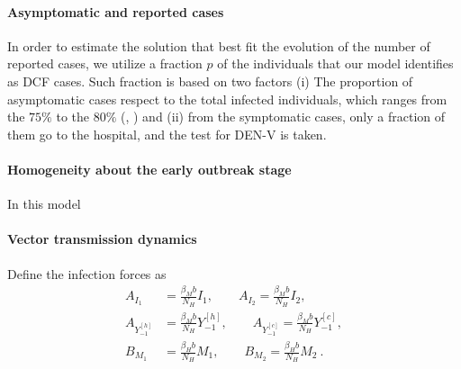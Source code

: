     \paragraph{Asymptomatic and reported cases} In order to estimate the solution that best fit the 
    evolution of the number of reported cases, we utilize a fraction $p$ of the individuals that our model identifies as DCF cases. Such fraction is based on two factors (i) The proportion of asymptomatic cases respect to the total infected individuals, which ranges from the $75\%$ to the $80\%$ (\cite{Bosch2018}, \cite{Reiter2010}) and (ii) from the symptomatic cases, only a fraction of them
     go to the hospital, and the test for DEN-V is taken. 
    
    
    


    
    \paragraph{Homogeneity about the early outbreak stage}
In this model    
    

    \paragraph{Vector transmission dynamics}
        Define the infection forces as
    \begin{equation}
        \begin{aligned}
            A_{I_1} &=
                \frac{\beta_Mb}{N_H} I_1, \qquad
            A_{I_2}=
                \frac{\beta_Mb}{N_H} I_2,
        \\
            A_{Y_{-1}^{[h]}}&=
            \frac{\beta_Mb}{N_H} Y_{-1} ^{[h]}, \qquad
            A_{Y_{-1}^{[c]}}=
                \frac{\beta_Mb}{N_H} Y_{-1}^{[c]},
        \\
            B_{M_1} &= 
                \frac{\beta_Hb}{N_H}M_1, \qquad
            B_{M_2}=
                \frac{\beta_Hb}{N_H}M_2 ~.
        \end{aligned}
    \end{equation}

